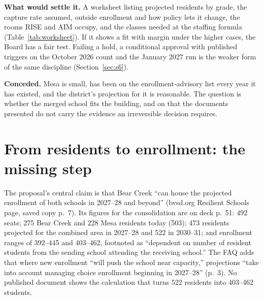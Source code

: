 \documentclass[11pt]{article}
\begin{document}
\noindent\textbf{What would settle it.} A worksheet listing projected residents by grade, the capture rate assumed, outside enrollment and how policy lets it change, the rooms RISE and AIM occupy, and the classes needed at the staffing formula (Table~\ref{tab:worksheet}). If it shows a fit with margin under the higher cases, the Board has a fair test. Failing a hold, a conditional approval with published triggers on the October 2026 count and the January 2027 run is the weaker form of the same discipline (Section~\ref{sec:s6}).

\noindent\textbf{Conceded.} Mesa is small, has been on the enrollment-advisory list every year it has existed, and the district's projection for it is reasonable. The question is whether the merged school fits the building, and on that the documents presented do not carry the evidence an irreversible decision requires.
\endgroup

\newpage
\section{From residents to enrollment: the missing step}\label{sec:s1}
The proposal's central claim is that Bear Creek ``can house the projected enrollment of both schools in 2027--28 and beyond'' (bvsd.org Resilient Schools page, saved copy p.\ 7). Its figures for the consolidation are on deck p.\ 51: 492 seats; 275 Bear Creek and 228 Mesa residents today (503); 473 residents projected for the combined area in 2027--28 and 522 in 2030--31; and enrollment ranges of 392--445 and 403--462, footnoted as ``dependent on number of resident students from the sending school attending the receiving school.'' The FAQ adds that where new enrollment ``will push the school near capacity,'' projections ``take into account managing choice enrollment beginning in 2027--28'' (p.\ 3). No published document shows the calculation that turns 522 residents into 403--462 students.
\end{document}
